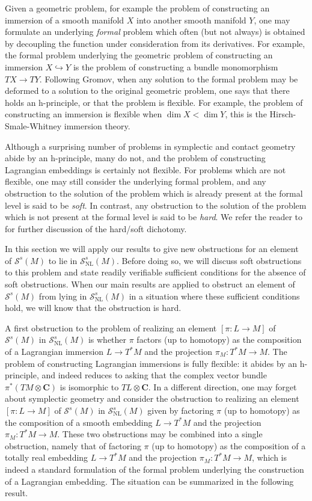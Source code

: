 \documentclass[reqno]{amsart}
\theoremstyle{theorem}
\theoremstyle{remark}
\theoremstyle{definition}
\newcommand{\NL}{\mathrm{NL}}
\newcommand{\C}{\mathbf{C}}
\renewcommand{\SS}{\mathcal{S}}
\begin{document}
Given a geometric problem, for example the problem of constructing an immersion of a smooth manifold $X$ into another smooth manifold $Y$, one may formulate an underlying {\em formal} problem which often (but not always) is obtained by decoupling the function under consideration from its derivatives. For example, the formal problem underlying the geometric problem of constructing an immersion $X \hookrightarrow Y$ is the problem of constructing a bundle monomorphism $TX \to TY$. Following Gromov, when any solution to the formal problem may be deformed to a solution to the original geometric problem, one says that there holds an h-principle, or that the problem is flexible. For example, the problem of constructing an immersion is flexible when $\dim X < \dim Y$, this is the Hirsch-Smale-Whitney immersion theory.

Although a surprising number of problems in symplectic and contact geometry abide by an h-principle, many do not, and the problem of constructing Lagrangian embeddings is certainly not flexible. For problems which are not flexible, one may still consider the underlying formal problem, and any obstruction to the solution of the problem which is already present at the formal level is said to be {\em soft}. In contrast, any obstruction to the solution of the problem which is not present at the formal level is said to be {\em hard}. We refer the reader to \cite{EM02} for further discussion of the hard/soft dichotomy.

In this section we will apply our results to give new obstructions for an element of $\SS^s(M)$ to lie in $\SS^s_\NL(M)$. Before doing so, we will discuss soft obstructions to this problem and state readily verifiable sufficient conditions for the absence of soft obstructions. When our main results are applied to obstruct an element of $\SS^s(M)$ from lying in $\SS^s_\NL(M)$ in a situation where these sufficient conditions hold, we will know that the obstruction is hard. 

A first obstruction to the problem of realizing an element $[\pi:L \to M]$ of $\SS^s(M)$ in $\SS^s_\NL(M)$ is whether $\pi$ factors (up to homotopy) as the composition of a Lagrangian immersion $L \to T^*M$ and the projection $\pi_M:T^*M \to M$. The problem of constructing Lagrangian immersions is fully flexible: it abides by an h-principle, and indeed reduces to asking that the complex vector bundle $\pi^* (TM \otimes \C)$ is isomorphic to $TL \otimes \C$. In a different direction, one may forget about symplectic geometry and consider the obstruction to realizing an element $[\pi:L \to M]$ of $\SS^s(M)$ in $\SS^s_\NL(M)$ given by factoring $\pi$ (up to homotopy) as the composition of a smooth embedding $L \to T^*M$ and the projection $\pi_M:T^*M \to M$. These two obstructions may be combined into a single obstruction, namely that of factoring $\pi$ (up to homotopy) as the composition of a totally real embedding $L \to T^*M$ and the projection $\pi_M:T^*M \to M$, which is indeed a standard formulation of the formal problem underlying the construction of a Lagrangian embedding. The situation can be summarized in the following result. 
\end{document}
